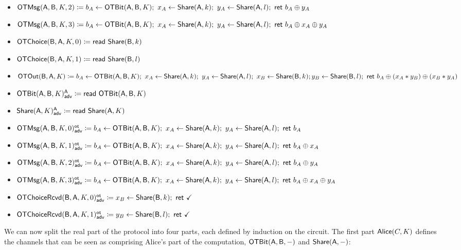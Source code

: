 \begin{itemize}
\begin{itemize}
\item $\OTMsg(\A,\B,K,2) \coloneqq b_A \leftarrow \OTBit(\A,\B,K); \ x_A \leftarrow \Share(\A,k); \ y_A \leftarrow \Share(\A,l); \ \ret{b_A \oplus y_A}$
\item $\OTMsg(\A,\B,K,3) \coloneqq b_A \leftarrow \OTBit(\A,\B,K); \ x_A \leftarrow \Share(\A,k); \ y_A \leftarrow \Share(\A,l); \ \ret{b_A \oplus x_A \oplus y_A}$\smallskip
\item $\OTChoice(\B,\A,K,0) \coloneqq \read{\Share(\B,k)}$
\item $\OTChoice(\B,\A,K,1) \coloneqq \read{\Share(\B,l)}$\smallskip
\item $\OTOut(\B,\A,K) \coloneqq b_A \leftarrow \OTBit(\A,\B,K); \ x_A \leftarrow \Share(\A,k); \ y_A \leftarrow \Share(\A,l); \ x_B \leftarrow \Share(\B,k); \\ y_B \leftarrow \Share(\B,l); \ \ret{b_A \oplus (x_A * y_B) \oplus (x_B * y_A)}$\medskip
\item {\color{blue} $\LeakOTBit(\A,\B,K)^\A_\adv \coloneqq \read{\OTBit(\A,\B,K)}$}
\item {\color{blue} $\LeakShare(\A,K)^\A_\adv \coloneqq \read{\Share(\A,K)}$}\medskip
\item {\color{blue} $\LeakOTMsg(\A,\B,K,0)^\ot_\adv \coloneqq b_A \leftarrow \OTBit(\A,\B,K); \ x_A \leftarrow \Share(\A,k); \ y_A \leftarrow \Share(\A,l); \ \ret{b_A}$}
\item {\color{blue} $\LeakOTMsg(\A,\B,K,1)^\ot_\adv \coloneqq b_A \leftarrow \OTBit(\A,\B,K); \ x_A \leftarrow \Share(\A,k); \ y_A \leftarrow \Share(\A,l); \ \ret{b_A \oplus x_A}$}
\item {\color{blue} $\LeakOTMsg(\A,\B,K,2)^\ot_\adv \coloneqq b_A \leftarrow \OTBit(\A,\B,K); \ x_A \leftarrow \Share(\A,k); \ y_A \leftarrow \Share(\A,l); \ \ret{b_A \oplus y_A}$}
\item {\color{blue} $\LeakOTMsg(\A,\B,K,3)^\ot_\adv \coloneqq b_A \leftarrow \OTBit(\A,\B,K); \ x_A \leftarrow \Share(\A,k); \ y_A \leftarrow \Share(\A,l); \ \ret{b_A \oplus x_A \oplus y_A}$}\medskip
\item {\color{blue} $\LeakOTChoiceRcvd(\B,\A,K,0)^\ot_\adv \coloneqq x_B \leftarrow \Share(\B,k); \ \ret{\checkmark}$}
\item {\color{blue} $\LeakOTChoiceRcvd(\B,\A,K,1)^\ot_\adv \coloneqq y_B \leftarrow \Share(\B,l); \ \ret{\checkmark}$}
\end{itemize}
\end{itemize}

\noindent We can now split the real part of the protocol into four parts, each defined by induction on the circuit. The first part $\Alice(C,K)$ defines the channels that can be seen as comprising Alice's part of the computation, $\OTBit(\A,\B,-)$ and $\Share(\A,-)$:

